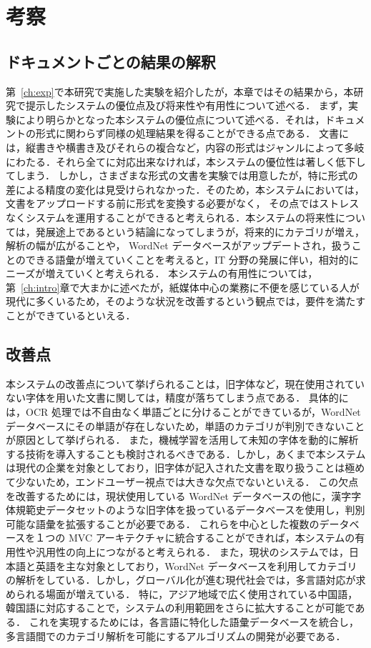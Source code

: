 \chapter{考察}
\label{ch:eval}

\quad

\section{ドキュメントごとの結果の解釈}
\label{sec:eval_docs}

第~\ref{ch:exp}で本研究で実施した実験を紹介したが，本章ではその結果から，本研究で提示したシステムの優位点及び将来性や有用性について述べる．
まず，実験により明らかとなった本システムの優位点について述べる．それは，ドキュメントの形式に関わらず同様の処理結果を得ることができる点である．
文書には，縦書きや横書き及びそれらの複合など，内容の形式はジャンルによって多岐にわたる．それら全てに対応出来なければ，本システムの優位性は著しく低下してしまう．
しかし，さまざまな形式の文書を実験では用意したが，特に形式の差による精度の変化は見受けられなかった．そのため，本システムにおいては，文書をアップロードする前に形式を変換する必要がなく，
その点ではストレスなくシステムを運用することができると考えられる．本システムの将来性については，発展途上であるという結論になってしまうが，将来的にカテゴリが増え，解析の幅が広がることや，
WordNet データベースがアップデートされ，扱うことのできる語彙が増えていくことを考えると，IT 分野の発展に伴い，相対的にニーズが増えていくと考えられる．
本システムの有用性については，第~\ref{ch:intro}章で大まかに述べたが，紙媒体中心の業務に不便を感じている人が現代に多くいるため，そのような状況を改善するという観点では，要件を満たすことができているといえる．

\section{改善点}
\label{sec:eval_improve}
本システムの改善点について挙げられることは，旧字体など，現在使用されていない字体を用いた文書に関しては，精度が落ちてしまう点である．
具体的には，OCR 処理では不自由なく単語ごとに分けることができているが，WordNet データベースにその単語が存在しないため，単語のカテゴリが判別できないことが原因として挙げられる．
また，機械学習を活用して未知の字体を動的に解析する技術を導入することも検討されるべきである．しかし，あくまで本システムは現代の企業を対象としており，旧字体が記入された文書を取り扱うことは極めて少ないため，エンドユーザー視点では大きな欠点でないといえる．
この欠点を改善するためには，現状使用している WordNet データべースの他に，漢字字体規範史データセットのような旧字体を扱っているデータベースを使用し，判別可能な語彙を拡張することが必要である．
これらを中心とした複数のデータベースを１つの MVC アーキテクチャに統合することができれば，本システムの有用性や汎用性の向上につながると考えられる．
また，現状のシステムでは，日本語と英語を主な対象としており，WordNet データベースを利用してカテゴリの解析をしている．しかし，グローバル化が進む現代社会では，多言語対応が求められる場面が増えている．
特に，アジア地域で広く使用されている中国語，韓国語に対応することで，システムの利用範囲をさらに拡大することが可能である．
これを実現するためには，各言語に特化した語彙データベースを統合し，多言語間でのカテゴリ解析を可能にするアルゴリズムの開発が必要である．
